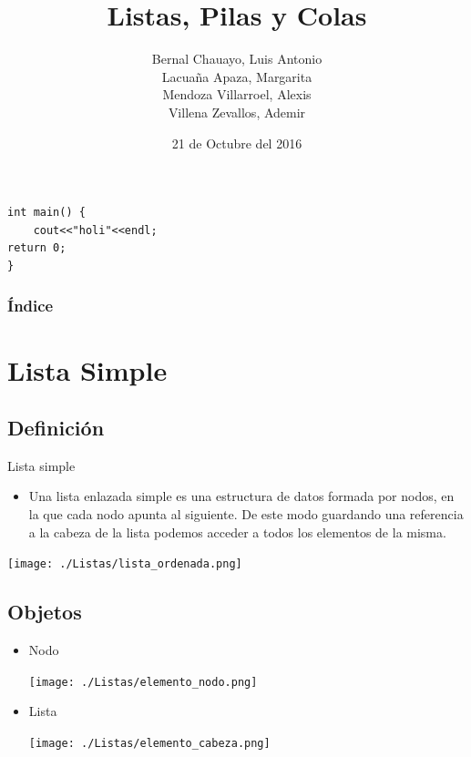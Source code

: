 \documentclass{beamer}
\title[Listas Pilas y colas]{Listas, Pilas y Colas}
\author[ALMA\and *Alexis\and Luis \and Margarita \and Ademir*]{{Bernal Chauayo, Luis Antonio}\\{Lacuaña Apaza, Margarita}\\{Mendoza Villarroel, Alexis}\\{Villena Zevallos, Ademir}}
\institute{{Ciencia de la Computación}
\\{Universidad Nacional de San Agustin}}
\date{21 de Octubre del 2016 }
\begin{document}
\begin{frame}[plain]
    \titlepage
 \end{frame}

\begin{frame}[fragile]
\begin{verbatim}
int main() {
	cout<<"holi"<<endl;
return 0;
}
\end{verbatim}
\end{frame}  

 \begin{frame}
  \frametitle{Índice}
  \begin{multicols}{2}
  \tableofcontents
  \end{multicols} 
\end{frame}

\section{Lista Simple}

\subsection{Definición}
\begin{frame}
Lista simple \\
  \begin{itemize}
  \item Una lista enlazada simple es una estructura de datos formada por nodos, en la que cada nodo apunta al siguiente.  De este modo guardando una referencia a la cabeza de la lista podemos acceder a todos los elementos de la misma. 
  \end{itemize}
  \texttt{[image: ./Listas/lista\_ordenada.png]}
  
\end{frame}
    
\subsection{Objetos}
\begin{frame}
 \begin{itemize}
  \item Nodo
    \begin{center}
      \texttt{[image: ./Listas/elemento\_nodo.png]}
    
    \end{center}
   
    
  \item Lista
    \begin{center}
    \texttt{[image: ./Listas/elemento\_cabeza.png]}
    \end{center}  
 
 \end{itemize}

\end{frame}
\end{document}
